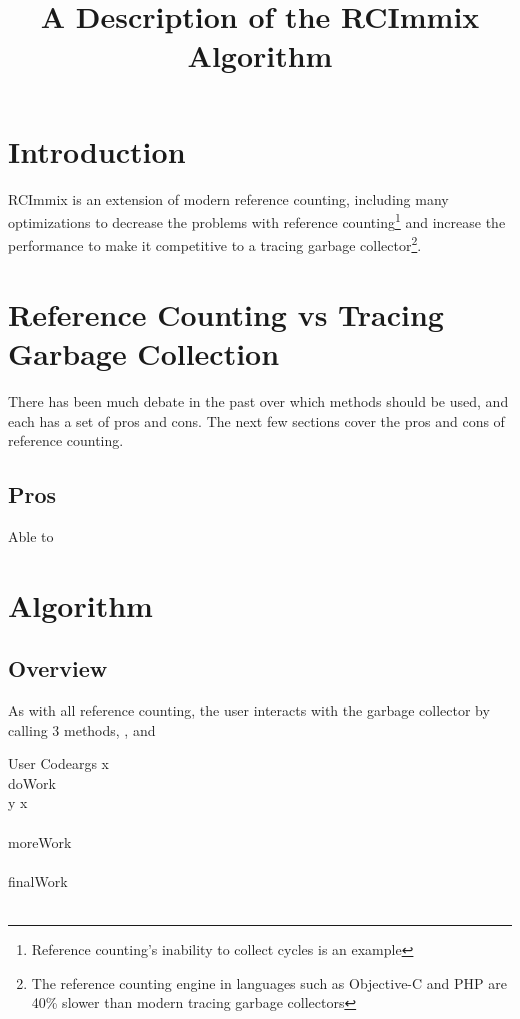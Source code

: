 \documentclass{article}
\title{A Description of the RCImmix Algorithm}
\begin{document}
\section{Introduction}

RCImmix is an extension of modern reference counting, including many optimizations to decrease the problems with reference counting\footnote{Reference counting's inability to collect cycles is an example} and increase the performance to make it competitive to a tracing garbage collector\footnote{The reference counting engine in languages such as Objective-C and PHP are 40\% slower than modern tracing garbage collectors}.

\section{Reference Counting vs Tracing Garbage Collection}

There has been much debate in the past over which methods should be used, and each has a set of pros and cons. The next few sections cover the pros and cons of reference counting.

\subsection{Pros}

Able to \cite{rcimmix}


\section{Algorithm}

\subsection{Overview}

As with all reference counting, the user interacts with the garbage collector by calling 3 methods, ,  and 

\begin{pseudocode}{User Code}{args}
\MAIN
	x \GETS {}\\
	doWork\\
	y \GETS x\\
	\\
	moreWork\\
	\\
	finalWork\\
	\\
\ENDMAIN
\end{pseudocode}
\end{document}
